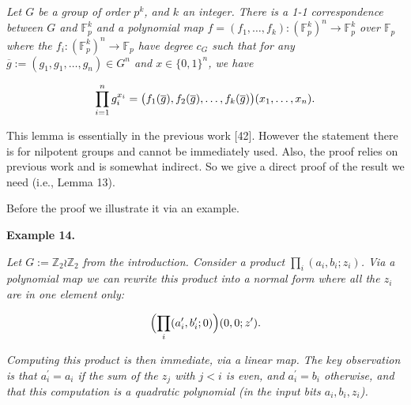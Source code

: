 \documentclass[10pt,a4paper]{article}
\begin{document}
\emph{Let $G$ be a group of order $p^{k}$,
and $k$ an integer. There is a 1-1 correspondence between $G$ and $\mathbb{F}_{p}^{k}$ and a polynomial map $f=(f_{1},\ldots,f_{k})\colon(\mathbb{F}_{p}^{k})^{n}\to\mathbb{F}_{p}^{k}$
over $\mathbb{F}_{p}$ where the $f_{i}\colon(\mathbb{F}_{p}^{k})^{n}\to\mathbb{F}_{p}$ have degree $c_{G}$
such that for any $\overline{g}:=(g_{1},g_{1},\ldots,g_{n})\in G^{n}$ and $x\in\{0,1\}^{n}$, we have}\par


\[\begin{gathered}
\prod_{i=1}^{n}g_{i}^{x_{i}}=\bigl{(}f_{1}(\overline{g}),f_{2}(\overline{g}),\ldots,f_{k}(\overline{g})\bigr{)}(x_{1},\ldots,x_{n}).
\end{gathered}\]






This lemma is essentially in the previous work [42].
However the statement there is for nilpotent groups and cannot be
immediately used. Also, the proof relies on previous work and is somewhat
indirect. So we give a direct proof of the result we need (i.e., Lemma 13).\par




Before the proof we illustrate it via an example.\par





\par\medskip\noindent\textbf{
\textbf{Example 14}\textbf{.}
}\par



\emph{Let $G:=\mathbb{Z}_{2}\wr\mathbb{Z}_{2}$ from the introduction.
Consider a product $\prod_{i}(a_{i},b_{i};z_{i})$. Via a polynomial map we can rewrite this product into a normal form where all the $z_{i}$ are in one element only:}\par


\[\begin{gathered}
\Bigl{(}\prod_{i}(a^{\prime}_{i},b^{\prime}_{i};0)\Bigr{)}(0,0;z^{\prime}).
\end{gathered}\]


\emph{Computing this product is then immediate, via a linear map. The key observation is that $a^{\prime}_{i}=a_{i}$ if the sum of the $z_{j}$ with $j<i$ is even, and $a^{\prime}_{i}=b_{i}$ otherwise, and that this computation is a quadratic polynomial (in the input bits $a_{i},b_{i},z_{i}$).}\par
\end{document}
